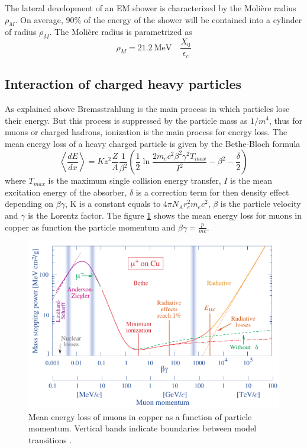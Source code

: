 The lateral development of an EM shower is characterized by the Moli\`ere radius $\rho_{M}$. On average, 90\% of the energy of the shower will be contained into a cylinder of radius $\rho_{M}$. The Moli\`ere radius is parametrized as \cite{Wigmans:392793}
\begin{equation}
  \rho_{M} = \SI{21.2}{\mega\eV} \quad \frac{X_0}{\epsilon_c}
\end{equation}

\subsection{Interaction of charged heavy particles}
\label{sec:InteracHeavyPart}

As explained above Bremsstrahlung is the main process in which particles lose their energy. But this process is suppressed by the particle mass as $1/m^4$, thus for muons or charged hadrons, ionization is the main process for energy loss. The mean energy loss of a heavy charged particle is given by the Bethe-Bloch formula \cite{Wigmans:392793}
\begin{equation}
  \left<\frac{dE}{dx}\right> = Kz^2\frac{Z}{A}\frac{1}{\beta^2}\left(\frac{1}{2}\ln\frac{2m_ec^2\beta^2\gamma^2T_{max}}{I^2} - \beta^2 - \frac{\delta}{2}\right)
\end{equation}
where $T_{max}$ is the maximum single collision energy transfer, $I$ is the mean excitation energy of the absorber, $\delta$ is a correction term for then density effect depending on $\beta\gamma$, K is a constant equals to $4\pi{}N_Ar_e^2m_ec^2$, $\beta$ is the particle velocity and $\gamma$ is the Lorentz factor. The figure \ref{fig:BetheBloch} shows the mean energy loss for muons in copper as function the particle momentum and $\beta\gamma = \frac{p}{mc}$.

\begin{figure}[htbp!]
  \centering
  \includegraphics[width=0.7\linewidth]{chap2/fig/rpp_icru49_cu_col.pdf}
  \caption{Mean energy loss of muons in copper as a function of particle momentum. Vertical bands indicate boundaries between model transitions \cite{Patrignani:2016xqp}.} \label{fig:BetheBloch}
\end{figure}

